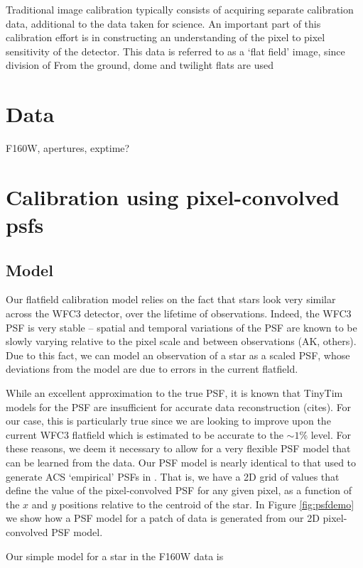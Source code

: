 \documentclass[12pt,preprint,pdftex]{aastex}
\begin{document}
Traditional image calibration typically consists of acquiring separate calibration 
data, additional to the data taken for science.  An important part of this 
calibration effort is in constructing an understanding of the pixel to pixel sensitivity 
of the detector.  This data is referred to as a `flat field' image, since division of From the ground, dome and 
twilight flats are used

\section{Data}

F160W, apertures, exptime? 

\section{Calibration using pixel-convolved psfs}

\subsection{Model}

Our flatfield calibration model relies on the fact that stars look very similar across the 
WFC3 detector, over the lifetime of observations.  Indeed, the WFC3 PSF is very stable --
spatial and temporal variations of the PSF are known to be slowly varying relative to 
the pixel scale and between observations (AK, others).  Due to this fact, we can model 
an observation of a star as a scaled PSF, whose deviations from the model are due to 
errors in the current flatfield.

While an excellent approximation to the true PSF, it is known that TinyTim models for the 
PSF are insufficient for accurate data reconstruction (cites).  For our case, this is particularly 
true since we are looking to improve upon the current WFC3 flatfield which is estimated to 
be accurate to the $\sim1\%$ level.   For these reasons, we deem it necessary to 
allow for a very flexible PSF model that can be learned from the data.  Our PSF model is 
nearly identical to that used to generate ACS `empirical' PSFs in \citet{AK}.  That is, we 
have a 2D grid of values that define the value of the pixel-convolved PSF for any given 
pixel, as a function of the $x$ and $y$ positions relative to the centroid of the star.  In Figure 
\ref{fig:psfdemo} we show how a PSF model for a patch of data is generated from our 2D 
pixel-convolved PSF model.

Our simple model for a star in the F160W data is 
\end{document}
